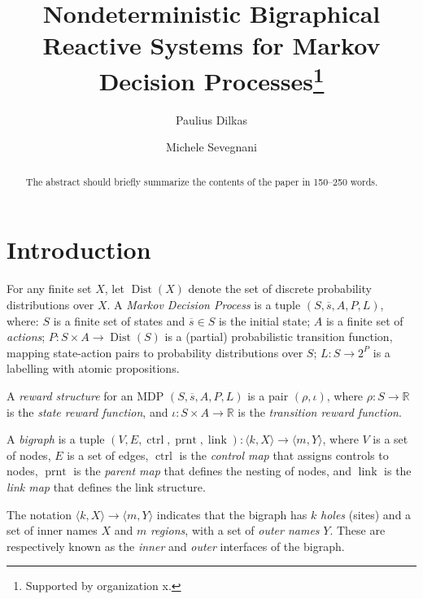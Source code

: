 \documentclass[runningheads]{llncs}
\DeclareMathOperator{\Dist}{Dist}
\DeclareMathOperator{\ctrl}{ctrl}
\DeclareMathOperator{\prnt}{prnt}
\DeclareMathOperator{\link}{link}
\begin{document}
\title{Nondeterministic Bigraphical Reactive Systems for Markov Decision
  Processes\thanks{Supported by organization x.}}
\author{Paulius Dilkas \and
  Michele Sevegnani}
%
\maketitle

\begin{abstract}
The abstract should briefly summarize the contents of the paper in
150--250 words.

\end{abstract}

\section{Introduction}

\begin{definition}
  For any finite set $X$, let $\Dist(X)$ denote the set of discrete probability
  distributions over $X$. A \emph{Markov Decision Process} is a tuple $ (S,
  \overline{s}, A, P, L)$, where: $S$ is a finite set of states and
  $\overline{s} \in S$ is the initial state; $A$ is a finite set of
  \emph{actions}; $P : S \times A \to \Dist(S)$ is a (partial) probabilistic
  transition function, mapping state-action pairs to probability distributions
  over $S$; $L : S \to 2^P$ is a labelling with atomic propositions.
\end{definition}

\begin{definition}
  A \emph{reward structure} for an MDP $(S, \overline{s}, A, P, L)$ is a pair
  $(\rho, \iota)$, where $\rho : S \to \mathbb{R}$ is the \emph{state reward
    function}, and $\iota : S \times A \to \mathbb{R}$ is the \emph{transition
    reward function}.
\end{definition}

\begin{definition}
  A \emph{bigraph} is a tuple $(V, E, \ctrl, \prnt, \link) : \langle k, X
  \rangle \to \langle m, Y \rangle$, where $V$ is a set of nodes, $E$ is a set
  of edges, $\ctrl$ is the \emph{control map} that assigns controls to nodes,
  $\prnt$ is the \emph{parent map} that defines the nesting of nodes, and
  $\link$ is the \emph{link map} that defines the link structure.

  The notation $\langle k, X \rangle \to \langle m, Y \rangle$ indicates that
  the bigraph has $k$ \emph{holes} (sites) and a set of inner names $X$ and $m$
  \emph{regions}, with a set of \emph{outer names} $Y$. These are respectively
  known as the \emph{inner} and \emph{outer} interfaces of the bigraph.
\end{definition}
\end{document}
